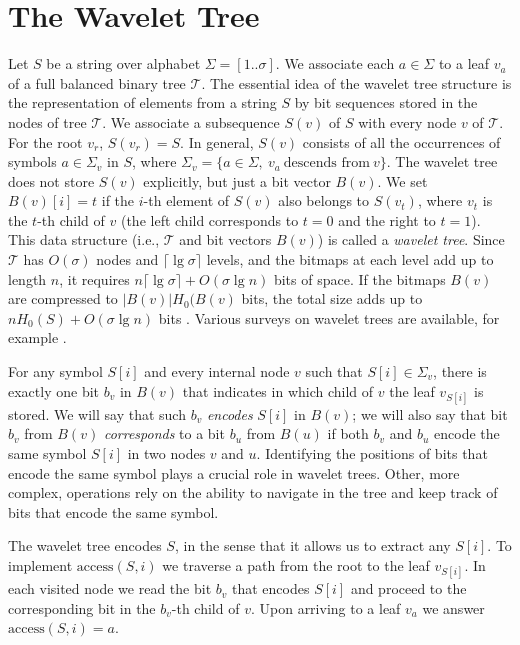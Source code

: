 \documentclass[11pt]{article}
\def\idrm#1{\ensuremath{\mathrm{#1}}}
\newcommand{\acc}{\idrm{access}}
\begin{document}
\section{The Wavelet Tree}
\label{sec:wavel}

Let $S$ be a string over alphabet $\Sigma=[1..\sigma]$.  We associate each
$a\in \Sigma$ to a leaf $v_a$ of a full balanced  binary tree $\mathcal{T}$. The essential idea of the wavelet tree structure \cite{GGV03} is the representation of elements from a string $S$ by bit sequences stored in
 the nodes of tree $\mathcal{T}$. We  associate a subsequence $S(v)$ 
of $S$ with every node $v$ of $\mathcal{T}$. For the root $v_r$, $S(v_r)=S$. 
In general, $S(v)$ consists of all the occurrences of symbols $a\in \Sigma_v$ 
in $S$, where $\Sigma_v = \{a \in\Sigma,~v_a~\textrm{descends from}~v\}$.
The wavelet tree does not store $S(v)$ explicitly, but just a bit vector
$B(v)$. We set $B(v)[i]=t$ if the $i$-th element
of $S(v)$ also belongs to $S(v_t)$, where $v_t$ is the $t$-th child of $v$
(the left child corresponds to $t=0$ and the right to $t=1$).
This data structure (i.e., $\mathcal{T}$ and bit vectors $B(v)$) is called a 
\emph{wavelet tree}. Since $\mathcal{T}$ has $O(\sigma)$ nodes and 
$\lceil\lg\sigma\rceil$ levels, and the bitmaps at each level add up to length
$n$, it requires $n\lceil\lg\sigma\rceil + O(\sigma\lg n)$ bits of space. If
the bitmaps $B(v)$ are compressed to $|B(v)|H_0(B(v)$ bits, the total size
adds up to $nH_0(S)+O(\sigma\lg n)$ bits \cite{GGV03}. Various surveys on
wavelet trees are available, for example \cite{NM06,Nav12}.

For any  symbol $S[i]$ and  every internal node $v$ such that $S[i]\in \Sigma_v$, 
there is exactly one bit $b_v$ in $B(v)$ that indicates in which child 
of $v$  the leaf $v_{S[i]}$ is stored. We will say that such $b_v$ 
\emph{encodes} $S[i]$ in $B(v)$; we will also say that bit $b_v$ from $B(v)$ 
\emph{corresponds} to a bit $b_u$ from $B(u)$ if both $b_v$ and $b_u$ encode 
the same symbol $S[i]$ in two nodes $v$ and $u$. 
Identifying the positions of bits that encode the same 
symbol plays a crucial role in wavelet trees. Other, more complex, 
operations rely on the ability to navigate in the tree and keep track of 
bits that encode the same symbol.

The wavelet tree encodes $S$, in the sense that it allows us to extract any
$S[i]$. To implement $\acc(S,i)$ we traverse a path from the root to the leaf 
$v_{S[i]}$. In each visited node we read the bit $b_v$ that encodes $S[i]$ and 
proceed to the corresponding bit in the $b_v$-th child of $v$. Upon arriving 
to a leaf $v_a$ we answer $\acc(S,i)=a$. 
\end{document}
